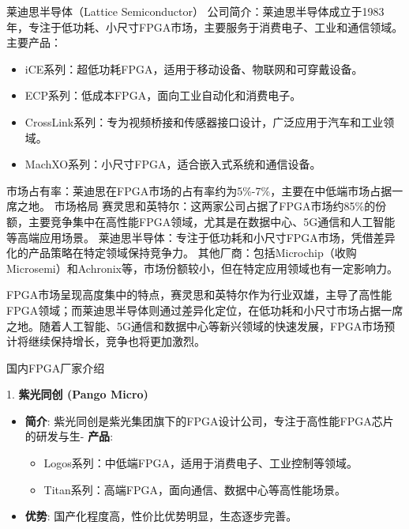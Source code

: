 \documentclass[
  ignorenonframetext,
  chinese,
]{beamer}
\providecommand{\tightlist}{%
  \setlength{\itemsep}{0pt}\setlength{\parskip}{0pt}}
\begin{document}
\begin{frame}
\begin{block}{莱迪思半导体（Lattice Semiconductor）}
\label{ux83b1ux8feaux601dux534aux5bfcux4f53lattice-semiconductor}
公司简介：莱迪思半导体成立于1983年，专注于低功耗、小尺寸FPGA市场，主要服务于消费电子、工业和通信领域。
主要产品：

\begin{itemize}
\tightlist
\item
  iCE系列：超低功耗FPGA，适用于移动设备、物联网和可穿戴设备。
\item
  ECP系列：低成本FPGA，面向工业自动化和消费电子。
\item
  CrossLink系列：专为视频桥接和传感器接口设计，广泛应用于汽车和工业领域。
\item
  MachXO系列：小尺寸FPGA，适合嵌入式系统和通信设备。
\end{itemize}

市场占有率：莱迪思在FPGA市场的占有率约为5\%-7\%，主要在中低端市场占据一席之地。
市场格局
赛灵思和英特尔：这两家公司占据了FPGA市场约85\%的份额，主要竞争集中在高性能FPGA领域，尤其是在数据中心、5G通信和人工智能等高端应用场景。
莱迪思半导体：专注于低功耗和小尺寸FPGA市场，凭借差异化的产品策略在特定领域保持竞争力。
其他厂商：包括Microchip（收购Microsemi）和Achronix等，市场份额较小，但在特定应用领域也有一定影响力。
\end{block}
\end{frame}

\begin{frame}
FPGA市场呈现高度集中的特点，赛灵思和英特尔作为行业双雄，主导了高性能FPGA领域；而莱迪思半导体则通过差异化定位，在低功耗和小尺寸市场占据一席之地。随着人工智能、5G通信和数据中心等新兴领域的快速发展，FPGA市场预计将继续保持增长，竞争也将更加激烈。
\end{frame}

\begin{frame}{国内FPGA厂家介绍}
\label{ux56fdux5185fpgaux5382ux5bb6ux4ecbux7ecd}
\begin{block}{1. \textbf{紫光同创 (Pango Micro)}}
\label{ux7d2bux5149ux540cux521b-pango-micro}
\begin{itemize}
\tightlist
\item
  \textbf{简介}:
  紫光同创是紫光集团旗下的FPGA设计公司，专注于高性能FPGA芯片的研发与生-
  \textbf{产品}:

  \begin{itemize}
  \tightlist
  \item
    Logos系列：中低端FPGA，适用于消费电子、工业控制等领域。\\
  \item
    Titan系列：高端FPGA，面向通信、数据中心等高性能场景。\\
  \end{itemize}
\item
  \textbf{优势}: 国产化程度高，性价比优势明显，生态逐步完善。
\end{itemize}
\end{block}
\end{frame}
\end{document}

